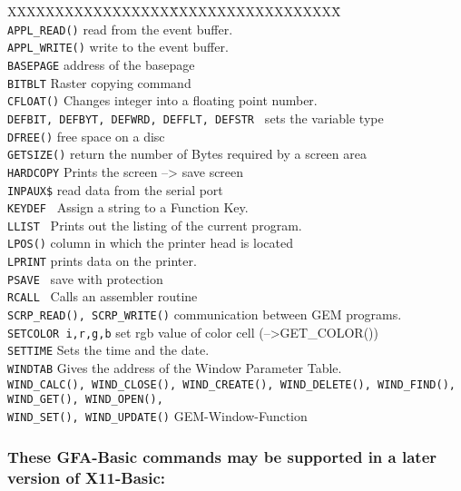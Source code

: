 \begin{tabbing}
XXXXXXXXXXXXXXXXX\=XXXXXXXXXXXXXXXXXX\=\kill\\
\verb|APPL_READ()|\>	read from the event buffer.\\
\verb|APPL_WRITE()|\>	write to the event buffer.\\
\verb|BASEPAGE|\>	address of the basepage\\
\verb|BITBLT|\>		Raster copying command\\
\verb|CFLOAT()|\>	Changes integer into a floating point number.\\
\verb|DEFBIT, DEFBYT, DEFWRD, DEFFLT, DEFSTR |\>  \>      sets the variable  type\\
\verb|DFREE()|\>		free space on a disc\\
\verb|GETSIZE()|\>	return the number of Bytes required by a screen area\\
\verb|HARDCOPY|\>       	Prints the screen          --> save screen\\
\verb|INPAUX$|\>        	read data from the serial port\\
\verb|KEYDEF |\>        	Assign a string to a Function Key.\\
\verb|LLIST |\>         	Prints out the listing of the current program.\\
\verb|LPOS()|\>         	column in which the printer head is located\\
\verb|LPRINT|\>         	prints data on the printer.\\
\verb|PSAVE |\>         	save with protection\\
\verb|RCALL |\>    	Calls an assembler routine\\
\verb|SCRP_READ(), SCRP_WRITE()|\>   communication between GEM programs.\\
\verb|SETCOLOR i,r,g,b|\>  set rgb value of color cell (-->GET\_COLOR())\\
\verb|SETTIME|\>		Sets the time and the date.\\
\verb|WINDTAB|\>	       	Gives the address of the Window Parameter Table.\\
\verb|WIND_CALC(), WIND_CLOSE(), WIND_CREATE(), WIND_DELETE(), WIND_FIND(),| \\
\verb|WIND_GET(), WIND_OPEN(), | \\
\verb|WIND_SET(), WIND_UPDATE()|\> \> GEM-Window-Function\\
\end{tabbing}

\subsubsection*{These GFA-Basic commands may be supported in a later version of 
X11-Basic:}

